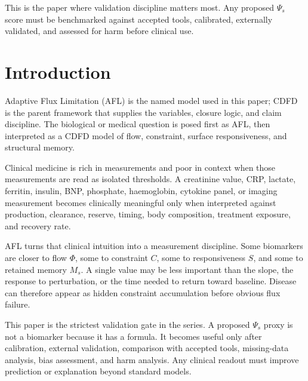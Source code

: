 \documentclass[12pt,a4paper]{article}
\begin{document}
This is the paper where validation discipline matters most. Any proposed $\Psi_s$ score must be benchmarked against accepted tools, calibrated, externally validated, and assessed for harm before clinical use.


\vspace{0.5em}\noindent{}
\vspace{0.75em}

\section{Introduction}

Adaptive Flux Limitation (AFL) is the named model used in this paper; CDFD is the parent framework that supplies the variables, closure logic, and claim discipline. The biological or medical question is posed first as AFL, then interpreted as a CDFD model of flow, constraint, surface responsiveness, and structural memory.

Clinical medicine is rich in measurements and poor in context when those measurements are read as isolated thresholds. A creatinine value, CRP, lactate, ferritin, insulin, BNP, phosphate, haemoglobin, cytokine panel, or imaging measurement becomes clinically meaningful only when interpreted against production, clearance, reserve, timing, body composition, treatment exposure, and recovery rate.

AFL turns that clinical intuition into a measurement discipline. Some biomarkers are closer to flow $\Phi$, some to constraint $C$, some to responsiveness $S$, and some to retained memory $M_s$. A single value may be less important than the slope, the response to perturbation, or the time needed to return toward baseline. Disease can therefore appear as hidden constraint accumulation before obvious flux failure.

This paper is the strictest validation gate in the series. A proposed $\Psi_s$ proxy is not a biomarker because it has a formula. It becomes useful only after calibration, external validation, comparison with accepted tools, missing-data analysis, bias assessment, and harm analysis. Any clinical readout must improve prediction or explanation beyond standard models.
\end{document}
